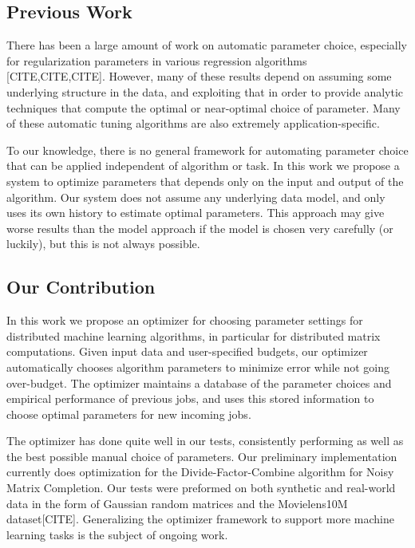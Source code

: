 \subsection{Previous Work}
There has been a large amount of work on automatic parameter choice, especially for regularization parameters in various regression algorithms [CITE,CITE,CITE]. However, many of these results depend on assuming some underlying structure in the data, and exploiting that in order to provide analytic techniques that compute the optimal or near-optimal choice of parameter. Many of these automatic tuning algorithms are also extremely application-specific. 

To our knowledge, there is no general framework for automating parameter choice that can be applied independent of algorithm or task. In this work we propose a system to optimize parameters that depends only on the input and output of the algorithm. Our system does not assume any underlying data model, and only uses its own history to estimate optimal parameters. This approach may give worse results than the model approach if the model is chosen very carefully (or luckily), but this is not always possible.

\subsection{Our Contribution}
In this work we propose an optimizer for choosing parameter settings for distributed machine learning algorithms, in particular for distributed matrix computations. Given input data and user-specified budgets, our optimizer automatically chooses algorithm parameters to minimize error while not going over-budget. The optimizer maintains a database of the parameter choices and empirical performance of previous jobs, and uses this stored information to choose optimal parameters for new incoming jobs.

The optimizer has done quite well in our tests, consistently performing as well as the best possible manual choice of parameters. Our preliminary implementation currently does optimization for the Divide-Factor-Combine algorithm for Noisy Matrix Completion. Our tests were preformed on both synthetic and real-world data in the form of Gaussian random matrices and the Movielens10M dataset[CITE]. Generalizing the optimizer framework to support more machine learning tasks is the subject of ongoing work.